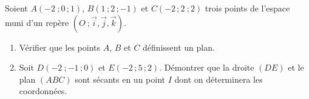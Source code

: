 \documentclass{cornouaille}
\begin{document}
  \begin{exercice}
    Soient $A(-2\
    ;0\,;1)$, $B(1\,;2\,;-1)$ et $C(-2\,;2\
    ;2)$ trois points de l'espace muni d'un repère $(O\
    ;\vec{i},\vec{j},\vec{k})$.
    \begin{enumerate}
    \item Vérifier que les points $A$, $B$ et $C$ définissent un plan.
    \item Soit $D(-2\
      ;-1\,;0)$ et $E(-2\,;5\,;2)$.  Démontrer que la droite
      $(DE)$
      et le plan $(ABC)$
      sont sécants en un point $I$
      dont on déterminera les coordonnées.
    \end{enumerate}
  \end{exercice}
\end{document}
